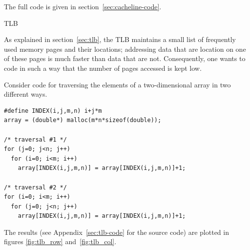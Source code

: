 The full code is given in section~\ref{sec:cacheline-code}.

 {TLB}
\label{sec:coding-tlb}

As explained in section~\ref{sec:tlb}, the \acf{TLB} maintains a small
list of frequently used memory pages and their locations; addressing
data that are location on one of these pages is much faster than data
that are not. Consequently, one wants to code in such a way that the
number of pages accessed is kept low.

Consider code for traversing the elements of a two-dimensional array
in two different ways.
\begin{verbatim}
#define INDEX(i,j,m,n) i+j*m
array = (double*) malloc(m*n*sizeof(double));

/* traversal #1 */
for (j=0; j<n; j++)
  for (i=0; i<m; i++)
    array[INDEX(i,j,m,n)] = array[INDEX(i,j,m,n)]+1;

/* traversal #2 */
for (i=0; i<m; i++)
  for (j=0; j<n; j++)
    array[INDEX(i,j,m,n)] = array[INDEX(i,j,m,n)]+1;
\end{verbatim}

The results (see Appendix~\ref{sec:tlb-code} for the source code) are
plotted in figures \ref{fig:tlb_row} and~\ref{fig:tlb_col}. 

